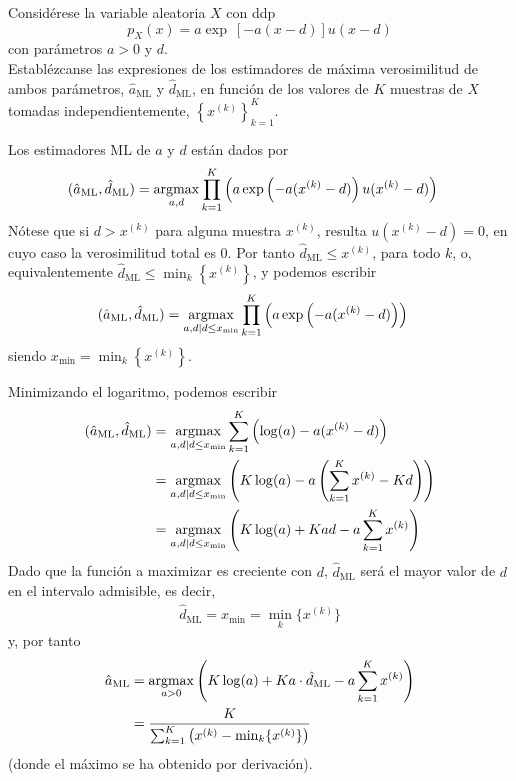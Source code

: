 \ifspanish

\question Considérese la variable aleatoria $X$ con ddp
$$p_X(x) = a\exp\ [-a(x-d) ]u(x-d)$$
con parámetros $a>0$ y $d$.\\
Establézcanse las expresiones de los estimadores de máxima verosimilitud de ambos parámetros, $\hat{a}_\text{ML}$ y $\hat{d}_\text{ML}$, en funci\'{o}n de los valores de $K$ muestras de $X$ tomadas independientemente, $\left\{x^{(k)}\right\}^{K}_{k=1}$.

\begin{solution}
Los estimadores ML de $a$ y $d$ están dados por
\begin{align*}
(\hat{a}_\text{ML}, \hat{d}_\text{ML}) 
	&= \operatorname*{argmax}_{a, d} \prod_{k=1}^{K} \left(a\exp\left(-a(x^{(k)}-d) \right)u(x^{(k)} - d)\right)
\end{align*}
Nótese que si $d > x^{(k)}$ para alguna muestra $x^{(k)}$, resulta $u(x^{(k)} - d)=0$, en cuyo caso la verosimilitud total es 0. Por tanto $\hat{d}_\text{ML} \le x^{(k)}$, para todo $k$, o, equivalentemente  $\hat{d}_\text{ML} \le \min_k \left\{x^{(k)}\right\}$, y podemos escribir
\begin{align*}
(\hat{a}_\text{ML}, \hat{d}_\text{ML}) 
	&= \operatorname*{argmax}_{a, d \mid d \le x_{\min} } 
	       \prod_{k=1}^{K} \left(a\exp\left(-a(x^{(k)}-d) \right)\right)
\end{align*}
siendo $x_{\min} = \min_k \left\{x^{(k)}\right\}$. 

Minimizando el logaritmo, podemos escribir
\begin{align*}
(\hat{a}_\text{ML}, \hat{d}_\text{ML}) 
	&= \operatorname*{argmax}_{a, d \mid d \le x_{\min}}
	       \sum_{k=1}^{K} \left(\log(a) -a (x^{(k)}-d) \right) \\
	&= \operatorname*{argmax}_{a, d \mid d \le x_{\min}} 
	       \left(K\log(a) -a \left(\sum_{k=1}^{K} x^{(k)}- Kd\right) \right) \\
	&= \operatorname*{argmax}_{a, d \mid d \le x_{\min}} 
	       \left(K\log(a) + Kad - a \sum_{k=1}^{K} x^{(k)} \right)
\end{align*}
Dado que  la función a maximizar es creciente con $d$, $\hat{d}_\text{ML}$ será el mayor valor de $d$ en el intervalo admisible, es decir,
\begin{align*}
\hat{d}_\text{ML} = x_{\min} = \min_{k}\{x^{(k)}\}
\end{align*}
y, por tanto
\begin{align*}
\hat{a}_\text{ML} 
	&= \operatorname*{argmax}_{a > 0} \left(K\log(a) + Ka\cdot \hat{d}_\text{ML} - a \sum_{k=1}^{K} x^{(k)} \right) \\
	&= \frac{K}{\sum^{K}_{k=1} \left(x^{(k)}-\min_k\{x^{(k)}\} \right)}	
\end{align*}
(donde el máximo se ha obtenido por derivación).
\end{solution}

